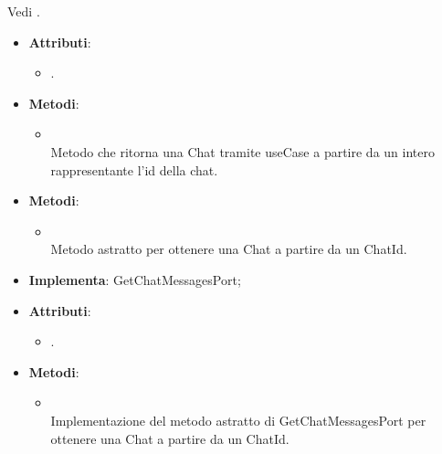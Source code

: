 \documentclass[10pt, a4paper]{article}
\begin{document}
Vedi .

\label{GetChatMessagesControllerDettaglio}
\begin{itemize}
    \item \textbf{Attributi}:
    \begin{itemize}
        \item {}.
    \end{itemize}
    \item \textbf{Metodi}:
    \begin{itemize}
        \item {}\\
        Metodo che ritorna una Chat tramite useCase a partire da un intero rappresentante l'id della chat. 
    \end{itemize}
\end{itemize}


\label{GetChatMessagesPortDettaglio}
\begin{itemize}
    \item \textbf{Metodi}:
    \begin{itemize}
        \item {}\\
        Metodo astratto per ottenere una Chat a partire da un ChatId.
    \end{itemize}
\end{itemize}


\label{GetChatMessagesPostgresDettaglio}
\begin{itemize}
    \item \textbf{Implementa}: GetChatMessagesPort;
    \item \textbf{Attributi}:
    \begin{itemize}
        \item {}.
    \end{itemize}
    \item \textbf{Metodi}:
    \begin{itemize}
        \item {}\\
        Implementazione del metodo astratto di GetChatMessagesPort per ottenere una Chat a partire da un ChatId.
        
    
    \end{itemize}
\end{itemize}
\end{document}
